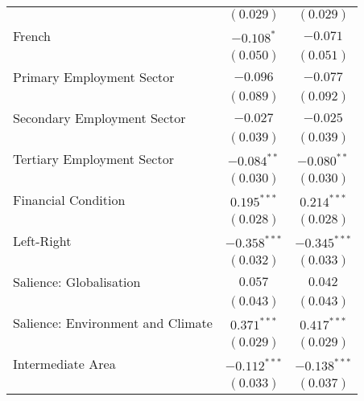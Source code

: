 \begin{center}
\begin{tiny}
\begin{longtable}{l@{} c@{} c@{}}
                                                          & $(0.029)$        & $(0.029)$        \\
\quad French                                              & $-0.108^{*}$     & $-0.071$         \\
                                                          & $(0.050)$        & $(0.051)$        \\
\quad Primary Employment Sector                           & $-0.096$         & $-0.077$         \\
                                                          & $(0.089)$        & $(0.092)$        \\
\quad Secondary Employment Sector                         & $-0.027$         & $-0.025$         \\
                                                          & $(0.039)$        & $(0.039)$        \\
\quad Tertiary Employment Sector                          & $-0.084^{**}$    & $-0.080^{**}$    \\
                                                          & $(0.030)$        & $(0.030)$        \\
\quad Financial Condition                                 & $0.195^{***}$    & $0.214^{***}$    \\
                                                          & $(0.028)$        & $(0.028)$        \\
\quad Left-Right                                          & $-0.358^{***}$   & $-0.345^{***}$   \\
                                                          & $(0.032)$        & $(0.033)$        \\
\quad Salience: Globalisation                             & $0.057$          & $0.042$          \\
                                                          & $(0.043)$        & $(0.043)$        \\
\quad Salience: Environment and Climate                   & $0.371^{***}$    & $0.417^{***}$    \\
                                                          & $(0.029)$        & $(0.029)$        \\
Intermediate Area                                         & $-0.112^{***}$   & $-0.138^{***}$   \\
                                                          & $(0.033)$        & $(0.037)$        \\

\end{longtable}
\end{tiny}
\end{center}
